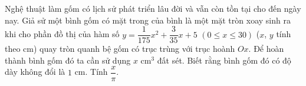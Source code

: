 \begin{ex}%
Nghệ thuật làm gốm có lịch sử phát triển lâu đời và vẫn còn tồn tại cho đến ngày nay. Giả sử một bình gốm có mặt trong của bình là một mặt tròn xoay sinh ra khi cho phần đồ thị của hàm số $y=\dfrac{1}{175} x^2+\dfrac{3}{35} x+5$ $\left(0 \leq x \leq 30\right)$ ($x$, $y$ tính theo cm) quay tròn quanh bệ gốm có trục trùng với trục hoành $O x$. Để hoàn thành bình gốm đó ta cần sử dụng $ x $ cm$^3$ đất sét. Biết rằng bình gốm đó có độ dày không đổi là $1$ cm. Tính $ \dfrac{x}{\pi} $.
\end{ex}

